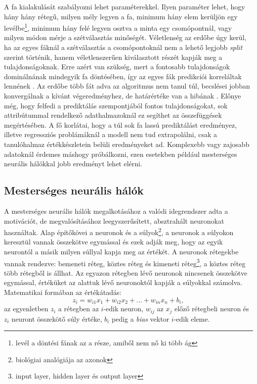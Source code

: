 \documentclass[12pt,letterpaper,oneside,openright]{book}
\begin{document}
A fa kialakulását szabályozni lehet paraméterekkel. Ilyen paraméter lehet, hogy hány hány rétegű, milyen mély legyen a fa, minimum hány elem kerüljön egy levélbe\footnote{levél a döntési fának az a része, amiből nem nő ki több ág}, minimum hány felé legyen osztva a minta egy csomópontnál, vagy milyen módon mérje a szétválasztás minőségét. Véletlenség az erdőbe úgy kerül, ha az egyes fáknál a szétválasztás a csomópontoknál nem a lehető legjobb \textit{split} szerint történik, hanem véletlenszerűen kiválasztott részét kapják meg a  tulajdonságoknak. Erre azért van szükség, mert a fontosabb tulajdonságok dominálnának mindegyik fa döntésében, így az egyes fák predikciói korreláltak lennének \cite{randomF}. Az erdőbe több fát adva az algoritmus nem tanul túl, becslései jobban konvergálnak a kívánt végeredményhez, de határértéke van a hibának \cite{rf2}. Előnye még, hogy felfedi a prediktálás szempontjából fontos tulajdonságokat, 
sok attribútummal rendelkező adathalmazoknál ez segíthet az összefüggések megértésében. A fő korlátai, hogy a túl sok fa lassú prediktálást eredményez, illetve regressziós problámáknál a modell nem tud extrapolálni, csak a tanulóhalmaz értékkészletein belüli eredményeket ad. Komplexebb vagy zajosabb adatoknál érdemes máshogy próbálkozni, ezen esetekben például mesterséges neurális hálókkal jobb eredményt lehet elérni.
\subsection{Mesterséges neurális hálók}
A mesterséges neurális hálók megalkotásához a valódi idegrendszer adta a motivációt, de megvalósításához leegyszerűsített, absztrahált neuronokat használtak. Alap építőkövei a neuronok és a súlyok\footnote{biológiai analógiája az axonok}, a neuronok a súlyokon keresztül vannak összekötve egymással és ezek adják meg, hogy az egyik neurontól a másik milyen súllyal kapja meg az értékét. A neuronok rétegekbe vannak rendezve: bemeneti réteg, köztes réteg és kimeneti réteg\footnote{input layer, hidden layer és output layer}, a köztes réteg több rétegből is állhat. Az egyazon rétegben lévő neuronok nincsenek összekötve egymással, értéküket az alattuk lévő neuronoktól kapják a súlyokkal számolva. Matematikai formában az értékátadás:
\begin{equation}
z_i = w_{i1}x_1 + w_{i2}x_{2} + ... + w_{in}x_n + b_i, 
\end{equation}
az egyenletben $z_i$ a rétegben az $i$-edik neuron, $w_{ij}$ az $x_j$ előző rétegbeli neuron és $z_i$ neuront összekötő súly értéke, $b_i$ pedig a \textit{bias} vektor $i$-edik eleme.  
\end{document}
